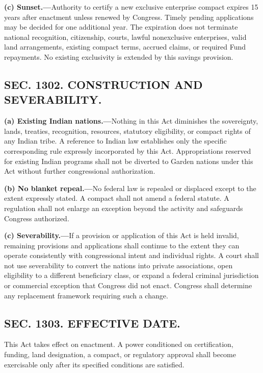 \documentclass[12pt,letterpaper]{article}
\begin{document}
\textbf{(c) Sunset.---}Authority to certify a new exclusive enterprise compact expires 15 years after enactment unless renewed by Congress. Timely pending applications may be decided for one additional year. The expiration does not terminate national recognition, citizenship, courts, lawful nonexclusive enterprises, valid land arrangements, existing compact terms, accrued claims, or required Fund repayments. No existing exclusivity is extended by this savings provision.

\subsection*{SEC. 1302. CONSTRUCTION AND SEVERABILITY.}

\textbf{(a) Existing Indian nations.---}Nothing in this Act diminishes the sovereignty, lands, treaties, recognition, resources, statutory eligibility, or compact rights of any Indian tribe. A reference to Indian law establishes only the specific corresponding rule expressly incorporated by this Act. Appropriations reserved for existing Indian programs shall not be diverted to Garden nations under this Act without further congressional authorization.

\textbf{(b) No blanket repeal.---}No federal law is repealed or displaced except to the extent expressly stated. A compact shall not amend a federal statute. A regulation shall not enlarge an exception beyond the activity and safeguards Congress authorized.

\textbf{(c) Severability.---}If a provision or application of this Act is held invalid, remaining provisions and applications shall continue to the extent they can operate consistently with congressional intent and individual rights. A court shall not use severability to convert the nations into private associations, open eligibility to a different beneficiary class, or expand a federal criminal jurisdiction or commercial exception that Congress did not enact. Congress shall determine any replacement framework requiring such a change.

\subsection*{SEC. 1303. EFFECTIVE DATE.}

This Act takes effect on enactment. A power conditioned on certification, funding, land designation, a compact, or regulatory approval shall become exercisable only after its specified conditions are satisfied.
\end{document}
